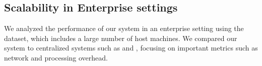 



\subsection{Scalability in Enterprise settings}
\label{cost_metric}
We analyzed the performance of our system in an enterprise setting using the \optc dataset, which includes a large number of host machines. We compared our system to centralized systems such as \flash and \kairos, focusing on important metrics such as network and processing overhead.

